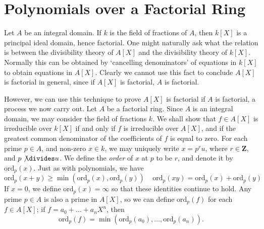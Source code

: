 \section{Polynomials over a Factorial Ring}

Let $A$ be an integral domain. If $k$ is the field of fractions of $A$, then $k[X]$ is a principal ideal domain, hence factorial. One might naturally ask what the relation is between the divisibility theory of $A[X]$ and the divisibility theory of $k[X]$. Normally this can be obtained by `cancelling denominators' of equations in $k[X]$ to obtain equations in $A[X]$. Clearly we cannot use this fact to conclude $A[X]$ is factorial in general, since if $A[X]$ is factorial, $A$ is factorial.

However, we can use this technique to prove $A[X]$ is factorial if $A$ is factorial, a process we now carry out. Let $A$ be a factorial ring. Since $A$ is an integral domain, we may consider the field of fractions $k$. We shall show that $f \in A[X]$ is irreducible over $k[X]$ if and only if $f$ is irreducible over $A[X]$, and if the greatest common denominator of the coefficients of $f$ is equal to zero. For each prime $p \in A$, and non-zero $x \in k$, we may uniquely write $x = p^r u$, where $r \in \mathbf{Z}$, and $p \not \divides u$. We define the {\it order} of $x$ at $p$ to be $r$, and denote it by $\text{ord}_p(x)$. Just as with polynomials, we have
%
\[ \text{ord}_p(x + y) \geq \min \left( \text{ord}_p(x),  \text{ord}_p(y) \right)\ \ \ \ \ \text{ord}_p(xy) = \text{ord}_p(x) + \text{ord}_p(y) \]
%
If $x = 0$, we define $\text{ord}_p(x) = \infty$ so that these identities continue to hold. Any prime $p \in A$ is also a prime in $A[X]$, so we can define $\text{ord}_p(f)$ for each $f \in A[X]$; if $f = a_0 + \dots + a_n X^n$, then
%
\[ \text{ord}_p(f) = \min \left( \text{ord}_p(a_0), \dots, \text{ord}_p(a_n) \right). \]
%
